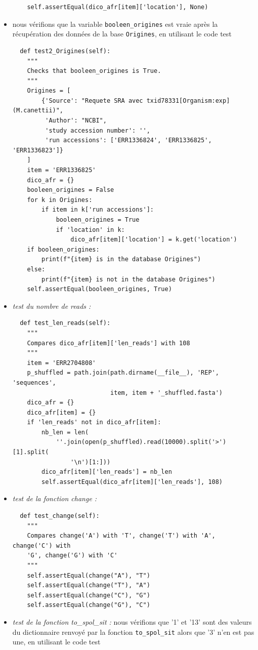 \documentclass[twoside,a4paper,11pt,frenchb,openany]{report}
\begin{document}
\begin{itemize}
\begin{verbatim}
    self.assertEqual(dico_afr[item]['location'], None)
\end{verbatim}
\item nous vérifions que la variable \texttt{booleen\_origines} est vraie après la récupération des données de la base \texttt{Origines}, en utilisant le code test
\begin{verbatim}
  def test2_Origines(self):
    """
    Checks that booleen_origines is True.
    """
    Origines = [
        {'Source': "Requete SRA avec txid78331[Organism:exp] (M.canettii)",
         'Author': "NCBI",
         'study accession number': '',
         'run accessions': ['ERR1336824', 'ERR1336825', 'ERR1336823']}
    ]
    item = 'ERR1336825'
    dico_afr = {}
    booleen_origines = False
    for k in Origines:
        if item in k['run accessions']:
            booleen_origines = True
            if 'location' in k:
                dico_afr[item]['location'] = k.get('location')
    if booleen_origines:
        print(f"{item} is in the database Origines")
    else:
        print(f"{item} is not in the database Origines")
    self.assertEqual(booleen_origines, True)
\end{verbatim}
\item \textit{test du nombre de reads :}
\begin{verbatim}
  def test_len_reads(self):
    """
    Compares dico_afr[item]['len_reads'] with 108
    """
    item = 'ERR2704808'
    p_shuffled = path.join(path.dirname(__file__), 'REP', 'sequences',
                           item, item + '_shuffled.fasta')
    dico_afr = {}
    dico_afr[item] = {}
    if 'len_reads' not in dico_afr[item]:
        nb_len = len(
            ''.join(open(p_shuffled).read(10000).split('>')[1].split(
                '\n')[1:]))
        dico_afr[item]['len_reads'] = nb_len
        self.assertEqual(dico_afr[item]['len_reads'], 108)
\end{verbatim}
\item \textit{test de la fonction change :}
\begin{verbatim}
  def test_change(self):
    """
    Compares change('A') with 'T', change('T') with 'A', change('C') with
    'G', change('G') with 'C'
    """
    self.assertEqual(change("A"), "T")
    self.assertEqual(change("T"), "A")
    self.assertEqual(change("C"), "G")
    self.assertEqual(change("G"), "C")
\end{verbatim}
\item \textit{test de la fonction to\_spol\_sit :} nous vérifions que '1' et '13' sont des valeurs du dictionnaire renvoyé par la fonction \texttt{to\_spol\_sit} alors que '3' n'en est pas une, en utilisant le code test

\end{itemize}
\end{document}
